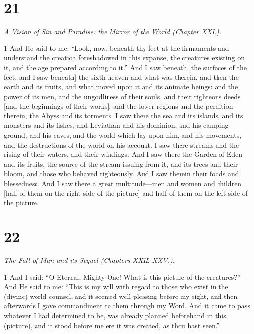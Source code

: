 \chapter{21}

\par \textit{A Vision of Sin and Paradise: the Mirror of the World (Chapter XXI.).}

\par 1 And He said to me: “Look, now, beneath thy feet at the firmaments and understand the creation foreshadowed in this expanse, the creatures existing on it, and the age prepared according to it.” And I saw beneath [the surfaces of the feet, and I saw beneath] the sixth heaven and what was therein, and then the earth and its fruits, and what moved upon it and its animate beings: and the power of its men, and the ungodliness of their souls, and their righteous deeds [and the beginnings of their works], and the lower regions and the perdition therein, the Abyss and its torments. I saw there the sea and its islands, and its monsters and its fishes, and Leviathan and his dominion, and his camping-ground, and his caves, and the world which lay upon him, and his movements, and the destructions of the world on his account. I saw there streams and the rising of their waters, and their windings. And I saw there the Garden of Eden and its fruits, the source of the stream issuing from it, and its trees and their bloom, and those who behaved righteously. And I saw therein their foods and blessedness. And I saw there a great multitude—men and women and children [half of them on the right side of the picture] and half of them on the left side of the picture. 

\chapter{22}

\par \textit{The Fall of Man and its Sequel (Chapters XXIL-XXV.).}

\par 1 And I said: “O Eternal, Mighty One! What is this picture of the creatures?” And He said to me: “This is my will with regard to those who exist in the (divine) world-counsel, and it seemed well-pleasing before my sight, and then afterwards I gave commandment to them through my Word. And it came to pass whatever I had determined to be, was already planned beforehand in this (picture), and it stood before me ere it was created, as thou hast seen.” 

